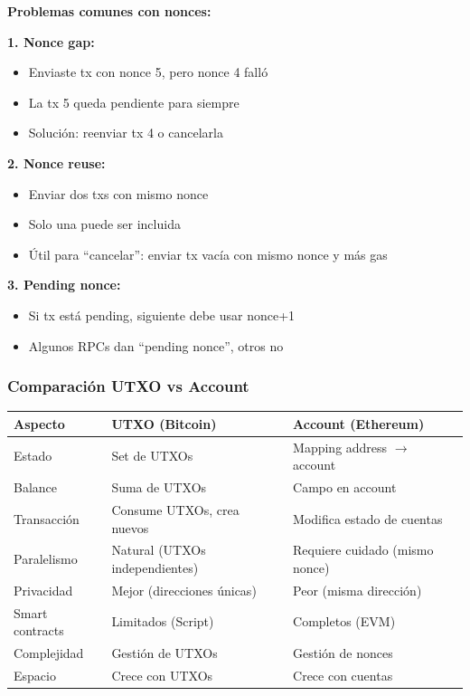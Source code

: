 \documentclass[11pt,a4paper,twoside,openright]{book}
\theoremstyle{definition}
\theoremstyle{plain}
\theoremstyle{remark}
\begin{document}
\begin{advertencia}
\textbf{Problemas comunes con nonces:}

\textbf{1. Nonce gap:}
\begin{itemize}
    \item Enviaste tx con nonce 5, pero nonce 4 falló
    \item La tx 5 queda pendiente para siempre
    \item Solución: reenviar tx 4 o cancelarla
\end{itemize}

\textbf{2. Nonce reuse:}
\begin{itemize}
    \item Enviar dos txs con mismo nonce
    \item Solo una puede ser incluida
    \item Útil para ``cancelar'': enviar tx vacía con mismo nonce y más gas
\end{itemize}

\textbf{3. Pending nonce:}
\begin{itemize}
    \item Si tx está pending, siguiente debe usar nonce+1
    \item Algunos RPCs dan ``pending nonce'', otros no
\end{itemize}
\end{advertencia}

\subsubsection{Comparación UTXO vs Account}

\begin{center}
\begin{tabular}{lll}
\toprule
\textbf{Aspecto} & \textbf{UTXO (Bitcoin)} & \textbf{Account (Ethereum)} \\
\midrule
Estado & Set de UTXOs & Mapping address $\to$ account \\
Balance & Suma de UTXOs & Campo en account \\
Transacción & Consume UTXOs, crea nuevos & Modifica estado de cuentas \\
Paralelismo & Natural (UTXOs independientes) & Requiere cuidado (mismo nonce) \\
Privacidad & Mejor (direcciones únicas) & Peor (misma dirección) \\
Smart contracts & Limitados (Script) & Completos (EVM) \\
Complejidad & Gestión de UTXOs & Gestión de nonces \\
Espacio & Crece con UTXOs & Crece con cuentas \\
\bottomrule
\end{tabular}
\end{center}
\end{document}
